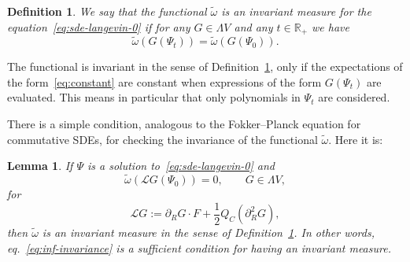 \documentclass{article}
\newcommand{\assign}{:=}
\newtheorem{definition}[theorem]{Definition}
\newtheorem{lemma}[theorem]{Lemma}
\begin{document}
\begin{definition}
  \label{definition_invariant}We say that the functional $\tilde{\omega}$ is
  an invariant measure for the equation~{\eqref{eq:sde-langevin-0}} if for any
  $G \in \Lambda V$ and any $t \in \mathbb{R}_+$ we have
  \begin{equation}
    \tilde{\omega} (G (\Psi_t)) = \tilde{\omega} (G (\Psi_0)) .
    \label{eq:constant}
  \end{equation}
\end{definition}

\begin{remark}
  The functional is invariant in the sense of
  Definition~\ref{definition_invariant}, only if the expectations of the
  form~{\eqref{eq:constant}} are constant when expressions of the form $G
  (\Psi_t)$ are evaluated. This means in particular that only polynomials in
  $\Psi_t$ are considered.
\end{remark}

There is a simple condition, analogous to the Fokker--Planck equation for
commutative SDEs, for checking the invariance of the functional
$\tilde{\omega}$. Here it is:

\begin{lemma}
  \label{lemma_invariant}If $\Psi$ is a solution
  to~{\eqref{eq:sde-langevin-0}} and
  \begin{equation}
    \tilde{\omega} (\mathcal{L}G (\Psi_0)) = 0, \qquad G \in \Lambda V
    \label{eq:inf-invariance},
  \end{equation}
  for
  \[ \mathcal{L}G \assign \partial_R G \cdot F + \frac{1}{2} Q_C (\partial_R^2
     G), \]
  then $\tilde{\omega}$ is an invariant measure in the sense of
  Definition~\ref{definition_invariant}. In other words,
  eq.~{\eqref{eq:inf-invariance}} is a sufficient condition for having an
  invariant measure.
\end{lemma}
\end{document}
